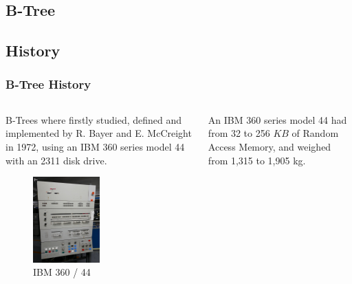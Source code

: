 \begin{frame}
    \section{B-Tree}
    \subsection{History}
    \frametitle{B-Tree History}
    \begin{columns}
        \begin{column}{0.5\textwidth}
            \begin{block}{}
                B-Trees where firstly studied, defined and implemented by R. Bayer and E. McCreight in 1972, using an IBM 360 series model 44 with an 2311 disk drive.
                \begin{figure}
                    \centering
                    \includegraphics[width=0.5\textwidth,height=\textheight,keepaspectratio]{resources/made/ibm360_44.png}
                    \caption[]{IBM 360 / 44}
                \end{figure}
            \end{block}
        \end{column}
        \begin{column}{0.5\textwidth}
            \begin{block}{}
                An IBM 360 series model 44 had from 32 to 256 \(KB\) of Random Access Memory, and weighed from 1,315 to 1,905 kg.
                \begin{figure}
                    \centering

\end{figure}
\end{block}
\end{column}
\end{columns}
\end{frame}

